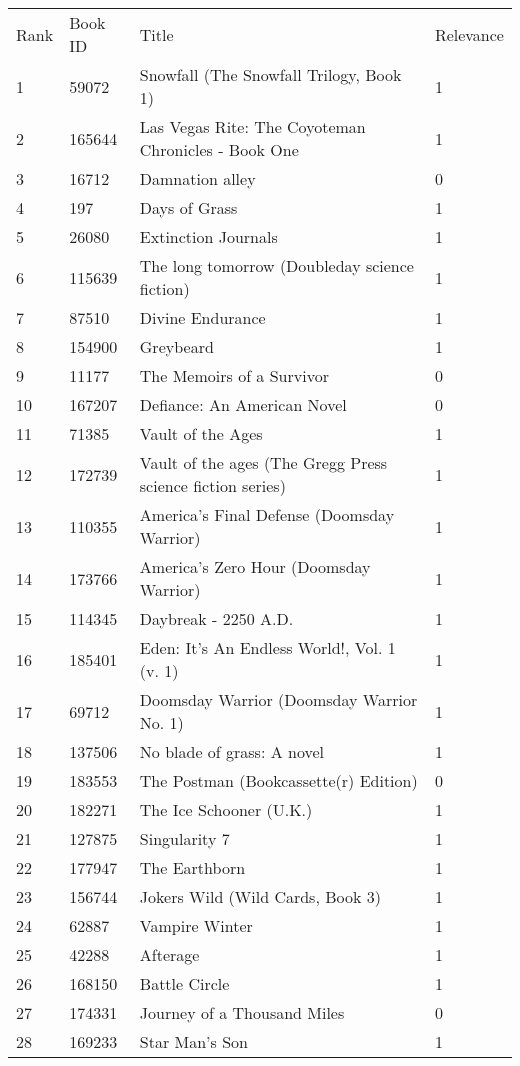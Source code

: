 \begin{tabular}{llll}
\toprule
\midrule
Rank & Book ID & Title & Relevance \\
1 & 59072 & Snowfall (The Snowfall Trilogy, Book 1) & 1 \\
2 & 165644 & Las Vegas Rite: The Coyoteman Chronicles - Book One & 1 \\
3 & 16712 & Damnation alley & 0 \\
4 & 197 & Days of Grass & 1 \\
5 & 26080 & Extinction Journals & 1 \\
6 & 115639 & The long tomorrow (Doubleday science fiction) & 1 \\
7 & 87510 & Divine Endurance & 1 \\
8 & 154900 & Greybeard & 1 \\
9 & 11177 & The Memoirs of a Survivor & 0 \\
10 & 167207 & Defiance: An American Novel & 0 \\
11 & 71385 & Vault of the Ages & 1 \\
12 & 172739 & Vault of the ages (The Gregg Press science fiction series) & 1 \\
13 & 110355 & America's Final Defense (Doomsday Warrior) & 1 \\
14 & 173766 & America's Zero Hour (Doomsday Warrior) & 1 \\
15 & 114345 & Daybreak - 2250 A.D. & 1 \\
16 & 185401 & Eden: It's An Endless World!, Vol. 1 (v. 1) & 1 \\
17 & 69712 & Doomsday Warrior (Doomsday Warrior No. 1) & 1 \\
18 & 137506 & No blade of grass: A novel & 1 \\
19 & 183553 & The Postman (Bookcassette(r) Edition) & 0 \\
20 & 182271 & The Ice Schooner (U.K.) & 1 \\
21 & 127875 & Singularity 7 & 1 \\
22 & 177947 & The Earthborn & 1 \\
23 & 156744 & Jokers Wild (Wild Cards, Book 3) & 1 \\
24 & 62887 & Vampire Winter & 1 \\
25 & 42288 & Afterage & 1 \\
26 & 168150 & Battle Circle & 1 \\
27 & 174331 & Journey of a Thousand Miles & 0 \\
28 & 169233 & Star Man's Son & 1 \\

\end{tabular}
